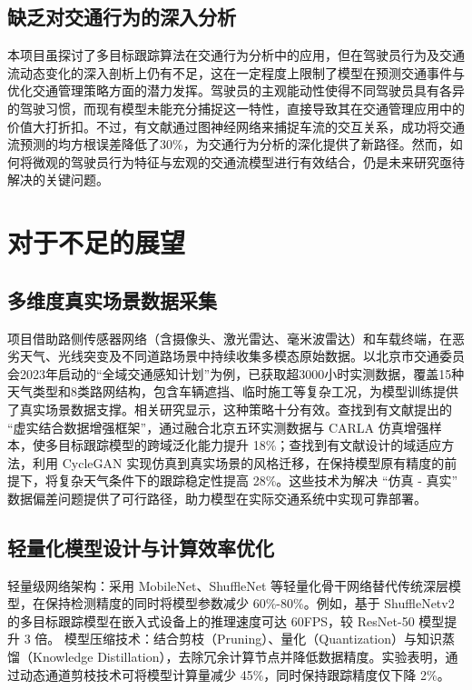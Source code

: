 \subsection{缺乏对交通行为的深入分析}



本项目虽探讨了多目标跟踪算法在交通行为分析中的应用，但在驾驶员行为及交通流动态变化的深入剖析上仍有不足，这在一定程度上限制了模型在预测交通事件与优化交通管理策略方面的潜力发挥。驾驶员的主观能动性使得不同驾驶员具有各异的驾驶习惯，而现有模型未能充分捕捉这一特性，直接导致其在交通管理应用中的价值大打折扣。不过，有文献\cite{li2020traffic}通过图神经网络来捕捉车流的交互关系，成功将交通流预测的均方根误差降低了30\%，为交通行为分析的深化提供了新路径。然而，如何将微观的驾驶员行为特征与宏观的交通流模型进行有效结合，仍是未来研究亟待解决的关键问题。

\section{对于不足的展望}



\subsection{多维度真实场景数据采集}

项目借助路侧传感器网络（含摄像头、激光雷达、毫米波雷达）和车载终端，在恶劣天气、光线突变及不同道路场景中持续收集多模态原始数据。以北京市交通委员会2023年启动的“全域交通感知计划”为例，已获取超3000小时实测数据，覆盖15种天气类型和8类路网结构，包含车辆遮挡、临时施工等复杂工况，为模型训练提供了真实场景数据支撑。相关研究显示，这种策略十分有效。查找到有文献\cite{tsinghua2022data}提出的 “虚实结合数据增强框架”，通过融合北京五环实测数据与 CARLA 仿真增强样本，使多目标跟踪模型的跨域泛化能力提升 18\%；查找到有文献\cite{chen2020adversarial}设计的域适应方法，利用 CycleGAN 实现仿真到真实场景的风格迁移，在保持模型原有精度的前提下，将复杂天气条件下的跟踪稳定性提高 28\%。这些技术为解决 “仿真 - 真实” 数据偏差问题提供了可行路径，助力模型在实际交通系统中实现可靠部署。



\subsection{轻量化模型设计与计算效率优化}


轻量级网络架构：采用 MobileNet、ShuffleNet 等轻量化骨干网络替代传统深层模型，在保持检测精度的同时将模型参数减少 60\%-80\%。例如，基于 ShuffleNetv2 的多目标跟踪模型在嵌入式设备上的推理速度可达 60FPS，较 ResNet-50 模型提升 3 倍\cite{casia2023lightweight}。
模型压缩技术：结合剪枝（Pruning）、量化（Quantization）与知识蒸馏（Knowledge Distillation），去除冗余计算节点并降低数据精度。实验表明，通过动态通道剪枝技术可将模型计算量减少 45\%，同时保持跟踪精度仅下降 2\%\cite{li2021lighttrack}。




